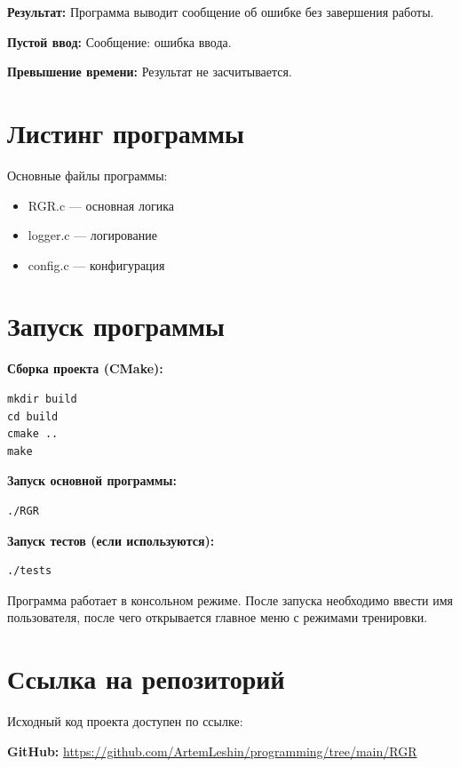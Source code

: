 \documentclass[a4paper,14pt,oneside,openany]{memoir}
\begin{document}
\textbf{Результат:}
Программа выводит сообщение об ошибке без завершения работы.

\textbf{Пустой ввод:}
Сообщение: ошибка ввода.

\textbf{Превышение времени:}
Результат не засчитывается.

\chapter{Листинг программы}

Основные файлы программы:

\begin{itemize}
\item RGR.c — основная логика
\item logger.c — логирование
\item config.c — конфигурация
\end{itemize}

\chapter{Запуск программы}

\textbf{Сборка проекта (CMake):}

\begin{verbatim}
mkdir build
cd build
cmake ..
make
\end{verbatim}

\textbf{Запуск основной программы:}

\begin{verbatim}
./RGR
\end{verbatim}

\textbf{Запуск тестов (если используются):}

\begin{verbatim}
./tests
\end{verbatim}

Программа работает в консольном режиме. После запуска необходимо ввести имя пользователя,
после чего открывается главное меню с режимами тренировки.

\chapter{Ссылка на репозиторий}

Исходный код проекта доступен по ссылке:

\textbf{GitHub:} \href{https://github.com/ArtemLeshin/programming/tree/main/RGR}{https://github.com/ArtemLeshin/programming/tree/main/RGR}
\end{document}
